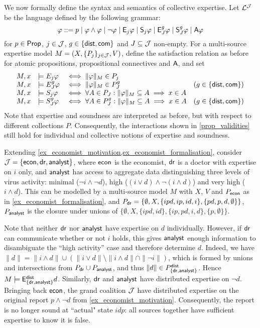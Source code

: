 We now formally define the syntax and semantics of collective expertise. Let
$\mathcal{L}^{\mathcal{J}}$ be the language defined by the following grammar:
\[
\varphi ::=
p \mid
\varphi \land \varphi \mid
\neg\varphi \mid
\mathsf{E}_j\varphi \mid \mathsf{S}_j\varphi \mid
\mathsf{E}_J^g\varphi \mid \mathsf{S}_J^g\varphi \mid
\mathsf{A}\varphi\]
for $p \in \mathsf{Prop}$, $j \in \mathcal{J}$, $g \in \{\mathsf{dist}, \mathsf{com}\}$ and
$J \subseteq \mathcal{J}$ non-empty. For a multi-source expertise model $M =
(X, \{P_j\}_{j \in \mathcal{J}}, V)$, define the satisfaction relation as before for
atomic propositions, propositional connectives and
$\mathsf{A}$, and set
\[
\begin{array}{lllr}
 M, x &\models E_j\varphi &\iff \|\varphi\|_M \in P_j \\
 M, x &\models E_J^g\varphi &\iff \|\varphi\|_M \in P_J^g
     & (g \in \{\mathsf{dist}, \mathsf{com}\}) \\
 M, x &\models S_j\varphi &\iff \forall A \in P_J: \|\varphi\|_M \subseteq A
     \implies x \in A \\
 M, x &\models S_J^g\varphi &\iff \forall A \in P_J^g: \|\varphi\|_M \subseteq A
     \implies x \in A
     & (g \in \{\mathsf{dist}, \mathsf{com}\})
\end{array}\]
Note that expertise and soundness are interpreted as before, but with respect
to different collections $P$. Consequently, the interactions
shown in \cref{prop_validities} still hold for individual and collective
notions of expertise and soundness.

\begin{example}
\label{ex_mutlisource}

    Extending \cref{ex_economist_motivation,ex_economist_formalisation},
    consider $\mathcal{J} = \{\mathsf{econ}, \mathsf{dr}, \mathsf{analyst}\}$, where $\mathsf{econ}$ is the economist,
    $\mathsf{dr}$ is a doctor with expertise on $i$ only, and $\mathsf{analyst}$ has access to
    aggregate data distinguishing three levels of virus activity: minimal
    ($\neg i \land \neg d$), high ($(i \lor d) \land \neg(i \land d)$) and very
    high ($i \land d$). This can be modelled by a multi-source model $M$ with
    $X$, $V$ and $P_{\mathsf{econ}}$ as in \cref{ex_economist_formalisation}, and $P_{\mathsf{dr}}
    = \{\emptyset, X, \{ipd, ip, id, i\}, \{pd, p, d, \emptyset\}\}$,
    $P_{\mathsf{analyst}}$ is the closure under unions of $\{\emptyset, X, \{ipd, id\},
    \{ip, pd, i, d\}, \{p, \emptyset\}\}$.

    Note that neither $\mathsf{dr}$ nor $\mathsf{analyst}$ have expertise on $d$ individually.
    However, if $\mathsf{dr}$ can communicate whether or not $i$ holds, this gives
    $\mathsf{analyst}$ enough information to disambiguate the ``high activity'' case
    and therefore determine $d$. Indeed, we have $\|d\| = \|i \land d\| \cup
    (\|i \lor d\| \setminus \|i \land d\| \cap \|\neg i\|)$, which is formed by
    unions and intersections from $P_{\mathsf{dr}} \cup P_{\mathsf{analyst}}$, and thus $\|d\| \in
    P^{\mathsf{dist}}_{\{\mathsf{dr}, \mathsf{analyst}\}}$. Hence $M \models \mathsf{E}_{\{\mathsf{dr}, \mathsf{analyst}\}}^{\mathsf{dist}}
    d$.
    Similarly, $\mathsf{dr}$ and $\mathsf{analyst}$ have distributed expertise on $\neg d$.
    Bringing back $\mathsf{econ}$, the grand coalition $\mathcal{J}$ have distributed expertise
    on the original report $p \land \neg d$ from
    \cref{ex_economist_motivation}. Consequently, the report is no longer sound
    at ``actual" state $idp$: all sources together have sufficient expertise to
    know it is false.

\end{example}

